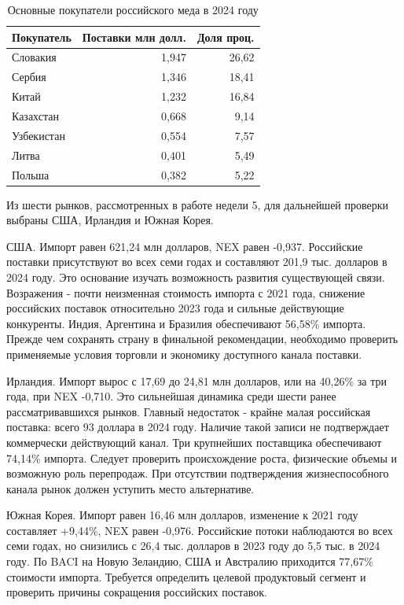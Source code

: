 \documentclass[12pt,a4paper]{article}
\begin{document}
\begin{table}[H]
\centering
\caption{Основные покупатели российского меда в 2024 году}\label{tab:dest}
{\small
\begin{tabular}{lrr}
\toprule
Покупатель & Поставки млн долл. & Доля проц. \\ \midrule
Словакия & 1,947 & 26,62 \\
Сербия & 1,346 & 18,41 \\
Китай & 1,232 & 16,84 \\
Казахстан & 0,668 & 9,14 \\
Узбекистан & 0,554 & 7,57 \\
Литва & 0,401 & 5,49 \\
Польша & 0,382 & 5,22 \\
\bottomrule
\end{tabular}}
\par{}
\end{table}
Из шести рынков, рассмотренных в работе недели 5, для дальнейшей проверки выбраны США, Ирландия и Южная Корея.

США. Импорт равен 621,24 млн долларов, NEX равен -0,937. Российские поставки присутствуют во всех семи годах и составляют 201,9 тыс. долларов в 2024 году. Это основание изучать возможность развития существующей связи. Возражения - почти неизменная стоимость импорта с 2021 года, снижение российских поставок относительно 2023 года и сильные действующие конкуренты. Индия, Аргентина и Бразилия обеспечивают 56,58\% импорта. Прежде чем сохранять страну в финальной рекомендации, необходимо проверить применяемые условия торговли и экономику доступного канала поставки.

Ирландия. Импорт вырос с 17,69 до 24,81 млн долларов, или на 40,26\% за три года, при NEX -0,710. Это сильнейшая динамика среди шести ранее рассматривавшихся рынков. Главный недостаток - крайне малая российская поставка: всего 93 доллара в 2024 году. Наличие такой записи не подтверждает коммерчески действующий канал. Три крупнейших поставщика обеспечивают 74,14\% импорта. Следует проверить происхождение роста, физические объемы и возможную роль перепродаж. При отсутствии подтверждения жизнеспособного канала рынок должен уступить место альтернативе.

Южная Корея. Импорт равен 16,46 млн долларов, изменение к 2021 году составляет +9,44\%, NEX равен -0,976. Российские потоки наблюдаются во всех семи годах, но снизились с 26,4 тыс. долларов в 2023 году до 5,5 тыс. в 2024 году. По BACI на Новую Зеландию, США и Австралию приходится 77,67\% стоимости импорта. Требуется определить целевой продуктовый сегмент и проверить причины сокращения российских поставок.
\end{document}
